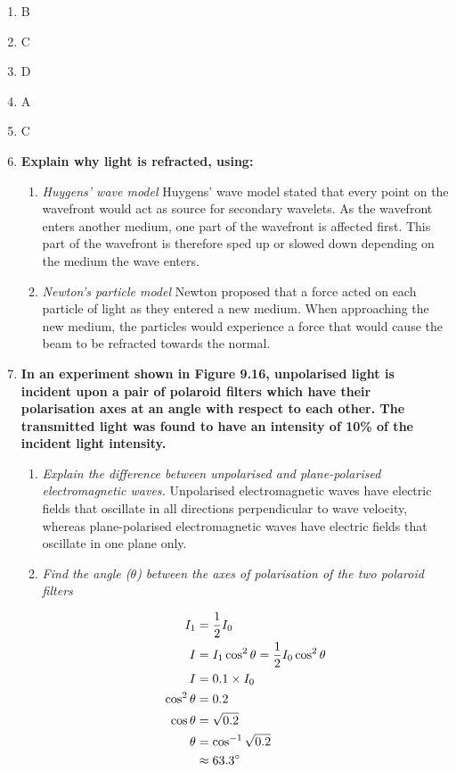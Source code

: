 \documentclass{report}
\newcommand{\acos}{\cos^{-1}}
\begin{document}
		\begin{enumerate}
			\item B
			\item C
			\item D
			\item A
			\item C
			\item \textbf{Explain why light is refracted, using:}
				\begin{enumerate}
					\item \textit{Huygens' wave model}
						\subitem Huygens' wave model stated that every point on the wavefront would act as source for  secondary wavelets. As the wavefront enters another medium, one part of the wavefront is affected first. This part of the wavefront is therefore sped up or slowed down depending on the medium the wave enters.

					\item \textit{Newton's particle model}
						\subitem Newton proposed that a force acted on each particle of light as they entered a new medium. When approaching the new medium, the particles would experience a force that would cause the beam to be refracted towards the normal.
				\end{enumerate}
			
			\item \textbf{In an experiment shown in Figure 9.16, unpolarised light is incident upon a pair of polaroid filters which have their polarisation axes at an angle with respect to each other. The transmitted light was found to have an intensity of 10\% of the incident light intensity.}
				\begin{enumerate}
					\item \textit{Explain the difference between unpolarised and plane-polarised electromagnetic waves.}
						\subitem Unpolarised electromagnetic waves have electric fields that oscillate in all directions perpendicular to wave velocity, whereas plane-polarised electromagnetic waves have electric fields that oscillate in one plane only.

					\item \textit{Find the angle ($\theta$) between the axes of polarisation of the two polaroid filters}

						\begin{align*}
							I_1 &= \frac{1}{2} I_0 \\
							I &= I_1 \cos^2{\theta}  = \frac{1}{2} I_0 \cos^2{\theta} \\
							I &= 0.1 \times I_0 \\
							\cos^2{\theta} &= 0.2 \\
							\cos{\theta} &= \sqrt{0.2} \\
							\theta &= \acos{\sqrt{0.2}} \\
							&\approx 63.3 \degree
						\end{align*}


\end{enumerate}
\end{enumerate}
\end{document}
